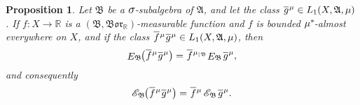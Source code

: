 \documentclass[
twoside=true,
paper=letter,
fontsize=11pt,
pagesize=auto,
leqno,
openany,
headsepline,
overfullrule,
]{scrbook}
\theoremstyle{plain}
\theoremstyle{plain}
\newtheorem{prop}[thm]{Proposition}
\theoremstyle{definition}
\theoremstyle{bfnoteitalic}
\theoremstyle{bfnoteroman}
\newcommand{\sigalg}[1]{\mathfrak{#1}}
\newcommand{\cali}[1]{\mathscr{#1}}
\newcommand{\kondexpsub}[2]
{\mathop{E}\nolimits_{#2}\hspace{-1pt}#1}
\newcommand{\condexpsub}[2]
{\mathop{\cali{E}\hspace{-1.5pt}}\nolimits_{#2}\hspace{-1pt}#1}
\newcommand{\borel}{\mathfrak{Bor}}
\newcommand{\textsigma}{\hbox{\large{$\sigma$}}\kern-1pt}
\newcommand{\restrictedto}[1]{_{\lvert#1}\kern-1.5pt}
\newcommand{\R}{\mathbb{R}}
\newcommand{\sigmaalgebra}{\sigalg{A}}
\newcommand{\sigmaalgebraii}{\sigalg{B}}
\newcommand{\kernast}{\ast\kern-1pt}
\newcommand{\Pstar}{\measure^\kernast}
\newcommand{\function}{f}
\newcommand{\functionii}{g}
\newcommand{\measurespace}{X}
\newcommand{\measure}{\mu}
\newcommand*\xbar[1]{%
   \hbox{%
     \vbox{%
       \hrule height 0.4pt %
       \kern0.4ex%
       \hbox{%
         \ensuremath{#1}%
       }%
     }%
   }%
}
\newcommand{\lebclass}[1]{\hspace{.5pt}\xbar{#1}\hspace{0.5pt}}
\newcommand{\ellclass}[2]{\lebclass{#1}^{#2}}
\begin{document}
\begin{prop} \label{measurable_functions_factor_out}
Let $\sigmaalgebraii$ be a $\textsigma$-subalgebra of $\sigmaalgebra$, and let the class
$\ellclass{\functionii}{\measure}
\in L_1(\measurespace, \sigmaalgebra,\measure)$.
If $\function:\measurespace\to\R$ is a
$(\sigmaalgebraii, \borel_\R)$\hyp{}measurable function and $\function$ is bounded 
$\Pstar$-almost everywhere on $\measurespace$,  and if the class
$\ellclass{\function}{\measure}\ellclass{\functionii}{\measure}
\in L_1(\measurespace, \sigmaalgebra,\measure)$, then
\[
\kondexpsub{\bigl(\ellclass{\function}{\measure}\ellclass{\functionii}{\measure}\bigr)}{\sigmaalgebraii} 
= 
\ellclass{\function}{\measure\restrictedto{\sigmaalgebraii}}
\kondexpsub{\ellclass{\functionii}{\measure}}{\sigmaalgebraii}
,\]
and consequently
\[
\condexpsub{\bigl(\ellclass{\function}{\measure}\ellclass{\functionii}{\measure}\bigr)}{\sigmaalgebraii} 
= 
\ellclass{\function}{\measure}
\condexpsub{\ellclass{\functionii}{\measure}}{\sigmaalgebraii}
.\]
\end{prop}
\end{document}
